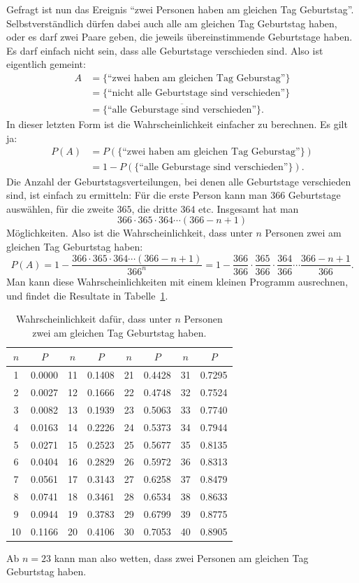 Gefragt ist nun das Ereignis
``zwei Personen haben am gleichen Tag Geburtstag''.
Selbstverständlich dürfen dabei auch alle am gleichen Tag
Geburtstag haben, oder es darf zwei Paare geben, die jeweils
übereinstimmende Geburtstage haben.
Es darf einfach nicht
sein, dass alle Geburtstage verschieden sind.
Also ist eigentlich
gemeint:
\begin{align*}
A&=\{\text{``zwei haben am gleichen Tag Geburstag''}\}\\
&=\{\text{``nicht alle Geburtstage sind verschieden''}\}\\
&=\overline{\{\text{``alle Geburstage sind verschieden''}\}}.
\end{align*}
In dieser letzten Form ist die Wahrscheinlichkeit einfacher zu
berechnen.
Es gilt ja:
\begin{align*}
P(A)&=P(\{\text{``zwei haben am gleichen Tag Geburstag''}\})\\
&=1-P(\{\text{``alle Geburstage sind verschieden''}\}).
\end{align*}
Die Anzahl der Geburtstagsverteilungen, bei denen alle Geburtstage
verschieden sind, ist einfach zu ermitteln: Für die erste Person
kann man $366$ Geburtstage auswählen, für die zweite $365$, die
dritte $364$ etc.
Insgesamt hat man
\[
366\cdot365\cdot364\dotsm(366-n+1)
\]
Möglichkeiten.
Also ist die Wahrscheinlichkeit, dass unter $n$
Personen zwei am gleichen Tag Geburtstag haben:
\[
P(A)
=
1-\frac{366\cdot365\cdot364\dotsm(366-n+1)}{366^n}
=
1-\frac{366}{366}\cdot
\frac{365}{366}\cdot
\frac{364}{366}
\dotsm
\frac{366-n+1}{366}
.
\]
Man kann diese Wahrscheinlichkeiten mit einem kleinen Programm
ausrechnen, und findet die Resultate in
Tabelle~\ref{geburtstagswahrscheinlichkeit}.
\begin{table}
\begin{center}
\begin{tabular}{|c|c|c|c|c|c|c|c|}
\hline
$n$&$P$&$n$&$P$&$n$&$P$&$n$&$P$\\
\hline
1&0.0000
&11&0.1408
&21&0.4428
&31&0.7295\\
2&0.0027
&12&0.1666
&22&0.4748
&32&0.7524\\
3&0.0082
&13&0.1939
&23&0.5063
&33&0.7740\\
4&0.0163
&14&0.2226
&24&0.5373
&34&0.7944\\
5&0.0271
&15&0.2523
&25&0.5677
&35&0.8135\\
6&0.0404
&16&0.2829
&26&0.5972
&36&0.8313\\
7&0.0561
&17&0.3143
&27&0.6258
&37&0.8479\\
8&0.0741
&18&0.3461
&28&0.6534
&38&0.8633\\
9&0.0944
&19&0.3783
&29&0.6799
&39&0.8775\\
10&0.1166
&20&0.4106
&30&0.7053
&40&0.8905\\
\hline
\end{tabular}
\end{center}
\caption{Wahrscheinlichkeit dafür, dass unter $n$ Personen zwei
am gleichen Tag Geburtstag haben.\label{geburtstagswahrscheinlichkeit}}
\end{table}
Ab $n=23$ kann man also wetten, dass zwei Personen am gleichen Tag
Geburtstag haben.

